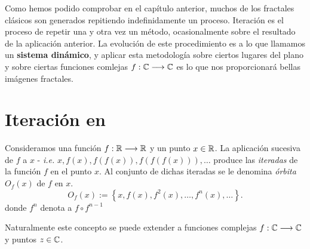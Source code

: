 
Como hemos podido comprobar en el capítulo anterior, muchos de los fractales clásicos son generados repitiendo indefinidamente un proceso. Iteración es el proceso de repetir una y otra vez un método, ocasionalmente sobre el resultado de la aplicación anterior. La evolución de este procedimiento es a lo que llamamos un \textbf{sistema dinámico}, y aplicar esta metodología sobre ciertos lugares del plano y sobre ciertas funciones comlejas $f:\mathbb{C}\longrightarrow\mathbb{C}$ es lo que nos proporcionará bellas imágenes fractales.

\section{Iteración en }
\begin{definicion}
    Consideramos una función $f:\mathbb{R}\longrightarrow\mathbb{R}$ y un punto $x\in\mathbb{R}$. La aplicación sucesiva de $f$ a $x$ - \textit{i.e.} $x,f(x),f(f(x)), f(f(f(x))),\dots$ produce las \textit{iteradas} de la función $f$ en el punto $x$. Al conjunto de dichas iteradas se le denomina \textit{órbita} $O_f(x)$ de $f$ en $x$.
    $$
    O_f(x):=\left\lbrace x, f(x), f^2(x), \dots, f^n(x), \dots\right\rbrace.
    $$
    donde $f^n$ denota a $f\circ f^{n-1}$
\end{definicion}

Naturalmente este concepto se puede extender a funciones complejas $f:\mathbb{C}\longrightarrow\mathbb{C}$ y puntos $z\in\mathbb{C}$.

